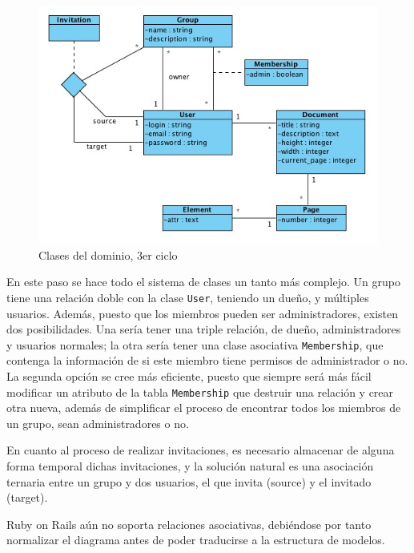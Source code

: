 \begin{figure}[h!]
\centering
\includegraphics[width=14cm]{uml3.png}
\caption{Clases del dominio, 3er ciclo}\label{fig:uml3}
\end{figure}

En este paso se hace todo el sistema de clases un tanto más complejo. Un grupo tiene una relación doble con la clase \texttt{User}, teniendo un dueño, y múltiples usuarios. Además, puesto que los miembros pueden ser administradores, existen dos posibilidades. Una sería tener una triple relación, de dueño, administradores y usuarios normales; la otra sería tener una clase asociativa \texttt{Membership}, que contenga la información de si este miembro tiene permisos de administrador o no. La segunda opción se cree más eficiente, puesto que siempre será más fácil modificar un atributo de la tabla \texttt{Membership} que destruir una relación y crear otra nueva, además de simplificar el proceso de encontrar todos los miembros de un grupo, sean administradores o no.

En cuanto al proceso de realizar invitaciones, es necesario almacenar de alguna forma temporal dichas invitaciones, y la solución natural es una asociación ternaria entre un grupo y dos usuarios, el que invita (source) y el invitado (target).

Ruby on Rails aún no soporta relaciones asociativas, debiéndose por tanto normalizar el diagrama antes de poder traducirse a la estructura de modelos.

